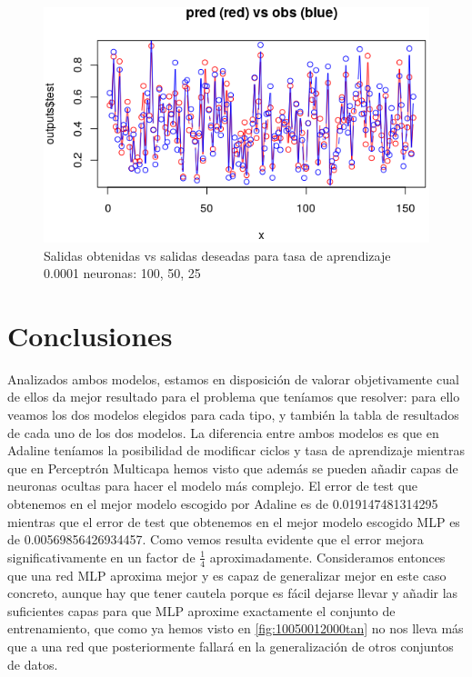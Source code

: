 \documentclass[11pt,spanish,listoffigures,listoftables]{workluis}
\begin{document}
\begin{figure}[H]
\centering
\includegraphics[scale=0.5]{bestmlp}
\caption{Salidas obtenidas vs salidas deseadas para tasa de aprendizaje 0.0001 neuronas: 100, 50, 25}\label{fig:bestmlp}
\end{figure}


\chapter{Conclusiones}

\par Analizados ambos modelos, estamos en disposición de valorar objetivamente cual de ellos da mejor resultado para el problema que teníamos que resolver: para ello veamos los dos modelos elegidos para cada tipo, y también la tabla de resultados de cada uno de los dos modelos. La diferencia entre ambos modelos es que en Adaline teníamos la posibilidad de modificar ciclos y tasa de aprendizaje mientras que en Perceptrón Multicapa hemos visto que además se pueden añadir capas de neuronas ocultas para hacer el modelo más complejo. El error de test que obtenemos en el mejor modelo escogido por Adaline es de 0.019147481314295 mientras que el error de test que obtenemos en el mejor modelo escogido MLP es de 0.00569856426934457. Como vemos resulta evidente que el error mejora significativamente en un factor de $\frac{1}{4}$ aproximadamente. Consideramos entonces que una red MLP aproxima mejor y es capaz de generalizar mejor en este caso concreto, aunque hay que tener cautela porque es fácil dejarse llevar y añadir las suficientes capas para que MLP aproxime exactamente el conjunto de entrenamiento, que como ya hemos visto en \ref{fig:10050012000tan} no nos lleva más que a una red que posteriormente fallará en la generalización de otros conjuntos de datos.
\end{document}

